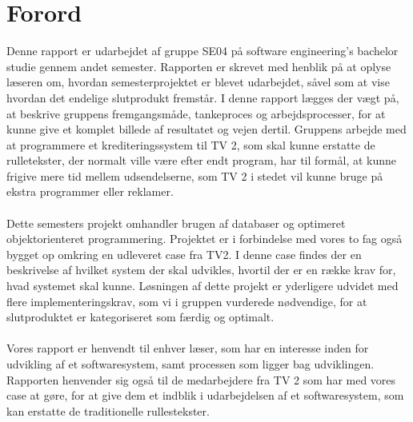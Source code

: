 
\clearpage
\section{Forord}
Denne rapport er udarbejdet af gruppe SE04 på software engineering's bachelor studie gennem andet semester. Rapporten er skrevet med henblik på at oplyse læseren om, hvordan semesterprojektet er blevet udarbejdet, såvel som at vise hvordan det endelige slutprodukt fremstår. I denne rapport lægges der vægt på, at beskrive gruppens fremgangsmåde, tankeproces og arbejdsprocesser, for at kunne give et komplet billede af resultatet og vejen dertil. Gruppens arbejde med at programmere et krediteringssystem til TV 2, som skal kunne erstatte de rulletekster, der normalt ville være efter endt program, har til formål, at kunne frigive mere tid mellem udsendelserne, som TV 2 i stedet vil kunne bruge på ekstra programmer eller reklamer.\\\\
Dette semesters projekt omhandler brugen af databaser og optimeret objektorienteret programmering. Projektet er i forbindelse med vores to fag også bygget op omkring en udleveret case fra TV2. I denne case findes der en beskrivelse af hvilket system der skal udvikles, hvortil der er en række krav for, hvad systemet skal kunne. Løsningen af dette projekt er yderligere udvidet med flere implementeringskrav, som vi i gruppen vurderede nødvendige, for at slutproduktet er kategoriseret som færdig og optimalt.\\\\
Vores rapport er henvendt til enhver læser, som har en interesse inden for udvikling af et softwaresystem, samt processen som ligger bag udviklingen. Rapporten henvender sig også til de medarbejdere fra TV 2 som har med vores case at gøre, for at give dem et indblik i udarbejdelsen af et softwaresystem, som kan erstatte de traditionelle rullestekster.